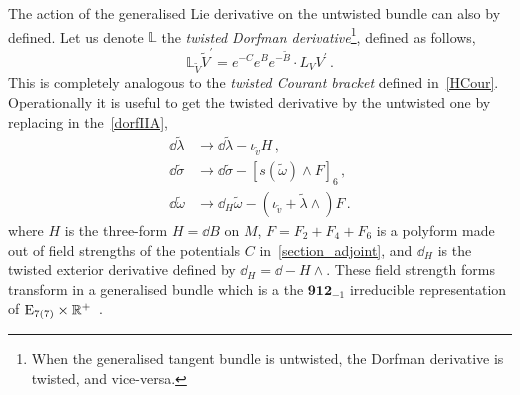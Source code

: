 \documentclass[debug]{phd}
\begin{document}
					The action of the generalised Lie derivative on the untwisted bundle can also by defined.
					Let us denote $\mathbb{L}$ the \emph{twisted Dorfman derivative}\footnote{%
						When the generalised tangent bundle is untwisted, the Dorfman derivative is twisted, and vice-versa.%
						},
					defined as follows,
							\begin{equation}\label{eq:fromLtotildeL}
								\mathbb{L}_{\tilde{V}} \tilde{V}^\prime = e^{-C}e^{B}e^{-\tilde{B}} \cdot L_{V}V^\prime \, .
							\end{equation}
					This is completely analogous to the \emph{twisted Courant bracket} defined in~\eqref{HCour}.
					Operationally it is useful to get the twisted derivative by the untwisted one by replacing in the~\eqref{dorfIIA},
							\begin{equation}
								\begin{split}
									\dd \tilde{\lambda} 	& \longrightarrow \dd \tilde{\lambda} - \iota_{\tilde{v}} H \, , \\
									\dd \tilde{\sigma} 	& \longrightarrow \dd \tilde{\sigma} - \left[ s(\tilde{\omega}) \wedge F \right]_6 \, , \\
									\dd \tilde{\omega}	& \longrightarrow \dd_H \tilde{\omega} - (\iota_{\tilde{v}} + \tilde{\lambda}\wedge ) F \, .
								\end{split}
							\end{equation}
					where $H$ is the three-form $H = \dd B$ on $M$, $F = F_2 + F_4 + F_6$ is a polyform made out of field strengths of the potentials $C$ in~\eqref{section_adjoint}, and $\dd_H$ is the twisted exterior derivative defined by $\dd_H = \dd - H \wedge$.
					These field strength forms transform in a generalised bundle which is a the $\mathbf{912}_{-1}$ irreducible representation of $\mathrm{E}_{7(7)} \times \mathbb{R}^+$~\cite{Grana:2009im}.
					
					
\end{document}
